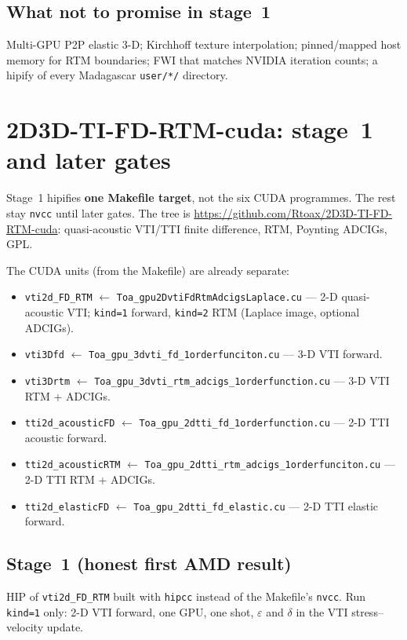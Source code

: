 \documentclass[11pt,a4paper]{article}
\begin{document}
\subsection*{What not to promise in stage~1}

Multi-GPU P2P elastic 3-D; Kirchhoff texture interpolation; pinned/mapped host memory for RTM boundaries; FWI that matches NVIDIA iteration counts; a hipify of every Madagascar \texttt{user/*/} directory.

\section{2D3D-TI-FD-RTM-cuda: stage~1 and later gates}

Stage~1 hipifies \textbf{one Makefile target}, not the six CUDA programmes.
The rest stay \texttt{nvcc} until later gates.
The tree is \url{https://github.com/Rtoax/2D3D-TI-FD-RTM-cuda}:
quasi-acoustic VTI/TTI finite difference, RTM, Poynting ADCIGs, GPL.

The CUDA units (from the Makefile) are already separate:

\begin{itemize}
\item \texttt{vti2d\_FD\_RTM} $\leftarrow$ \texttt{Toa\_gpu2DvtiFdRtmAdcigsLaplace.cu} ---
2-D quasi-acoustic VTI; \texttt{kind=1} forward, \texttt{kind=2} RTM (Laplace image, optional ADCIGs).
\item \texttt{vti3Dfd} $\leftarrow$ \texttt{Toa\_gpu\_3dvti\_fd\_1orderfunciton.cu} --- 3-D VTI forward.
\item \texttt{vti3Drtm} $\leftarrow$ \texttt{Toa\_gpu\_3dvti\_rtm\_adcigs\_1orderfunction.cu} --- 3-D VTI RTM + ADCIGs.
\item \texttt{tti2d\_acousticFD} $\leftarrow$ \texttt{Toa\_gpu\_2dtti\_fd\_1orderfunction.cu} --- 2-D TTI acoustic forward.
\item \texttt{tti2d\_acousticRTM} $\leftarrow$ \texttt{Toa\_gpu\_2dtti\_rtm\_adcigs\_1orderfunciton.cu} --- 2-D TTI RTM + ADCIGs.
\item \texttt{tti2d\_elasticFD} $\leftarrow$ \texttt{Toa\_gpu\_2dtti\_fd\_elastic.cu} --- 2-D TTI elastic forward.
\end{itemize}

\subsection*{Stage~1 (honest first AMD result)}

HIP of \texttt{vti2d\_FD\_RTM} built with \texttt{hipcc} instead of the Makefile's \texttt{nvcc}.
Run \texttt{kind=1} only: 2-D VTI forward, one GPU, one shot, $\varepsilon$ and $\delta$ in the VTI stress--velocity update.
\end{document}
